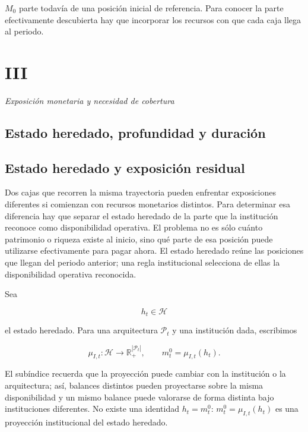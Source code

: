 \documentclass[10pt,a5paper,twoside]{article}
\begin{document}
\(M_0\) parte todavía de una posición inicial de referencia. Para conocer
la parte efectivamente descubierta hay que incorporar los recursos con
que cada caja llega al periodo.


\cleardoublepage
\setcounter{subsection}{0}
\vspace*{6mm}\section*{III}\label{iii.-exposiciuxf3n-monetaria-y-necesidad-de-cobertura}
\thispagestyle{plain}
{\large\itshape Exposición monetaria y necesidad de cobertura\par}\vspace{1.2ex}

\subsection*{Estado heredado, profundidad y duración}\label{estado-heredado-profundidad-y-duraciuxf3n}

\subsection{Estado heredado y exposición residual}\label{estado-heredado-y-exposiciuxf3n-residual}

Dos cajas que recorren la misma trayectoria pueden enfrentar exposiciones
diferentes si comienzan con recursos monetarios distintos. Para determinar
esa diferencia hay que separar el estado heredado de la parte que la
institución reconoce como disponibilidad operativa.
El problema no es sólo cuánto patrimonio o riqueza existe al inicio, sino qué parte de
esa posición puede utilizarse efectivamente para pagar ahora. El estado heredado reúne
las posiciones que llegan del periodo anterior; una regla institucional selecciona de ellas
la disponibilidad operativa reconocida.

Sea

\[
h_t\in\mathcal H
\]

el estado heredado. Para una arquitectura \(\mathcal P_t\) y una
institución dada, escribimos

\[
\mu_{I,t}:\mathcal H\to\mathbb R_+^{|\mathcal P_t|},
\qquad
m_t^0=\mu_{I,t}(h_t).
\]

El subíndice recuerda que la proyección puede cambiar con la institución o
la arquitectura; así, balances distintos pueden proyectarse sobre la misma
disponibilidad y un mismo balance puede valorarse de forma distinta bajo
instituciones diferentes. No existe una identidad \(h_t=m_t^0\):
\(m_t^0=\mu_{I,t}(h_t)\) es una proyección institucional del estado heredado.
\end{document}

